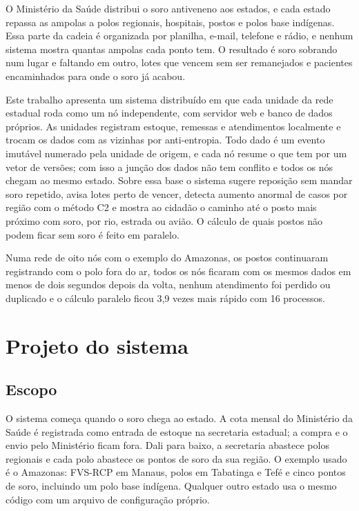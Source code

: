 \documentclass[a4paper,12pt]{article}
\begin{document}
\iniciarPreTextual
\fazcapa
\fazfolhaderosto

\begin{resumo}
O Ministério da Saúde distribui o soro antiveneno aos estados, e cada estado repassa as
ampolas a polos regionais, hospitais, postos e polos base indígenas. Essa parte da cadeia
é organizada por planilha, e-mail, telefone e rádio, e nenhum sistema mostra quantas
ampolas cada ponto tem. O resultado é soro sobrando num lugar e faltando em outro, lotes
que vencem sem ser remanejados e pacientes encaminhados para onde o soro já acabou.

Este trabalho apresenta um sistema distribuído em que cada unidade da rede estadual roda
como um nó independente, com servidor web e banco de dados próprios. As unidades registram
estoque, remessas e atendimentos localmente e trocam os dados com as vizinhas por
anti-entropia. Todo dado é um evento imutável numerado pela unidade de origem, e cada nó
resume o que tem por um vetor de versões; com isso a junção dos dados não tem conflito e
todos os nós chegam ao mesmo estado. Sobre essa base o sistema sugere reposição sem
mandar soro repetido, avisa lotes perto de vencer, detecta aumento anormal de casos por
região com o método C2 e mostra ao cidadão o caminho até o posto mais próximo com soro,
por rio, estrada ou avião. O cálculo de quais postos não podem ficar sem soro é feito em
paralelo.

Numa rede de oito nós com o exemplo do Amazonas, os postos continuaram registrando com o
polo fora do ar, todos os nós ficaram com os mesmos dados em menos de dois segundos depois
da volta, nenhum atendimento foi perdido ou duplicado e o cálculo paralelo ficou 3,9 vezes
mais rápido com 16 processos.
\end{resumo}

\sumario
\iniciarTextual

\section{Projeto do sistema}
\label{sec:projeto}

\subsection{Escopo}

O sistema começa quando o soro chega ao estado. A cota mensal do Ministério da Saúde é
registrada como entrada de estoque na secretaria estadual; a compra e o envio pelo
Ministério ficam fora. Dali para baixo, a secretaria abastece polos regionais e cada polo
abastece os pontos de soro da sua região. O exemplo usado é o Amazonas: FVS-RCP em Manaus,
polos em Tabatinga e Tefé e cinco pontos de soro, incluindo um polo base indígena.
Qualquer outro estado usa o mesmo código com um arquivo de configuração próprio.
\end{document}
